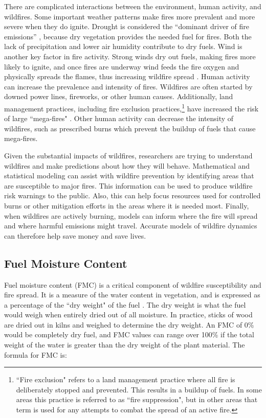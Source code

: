 \documentclass[11pt]{article}%
\begin{document}
There are complicated interactions between the environment, human activity, and wildfires. Some important weather patterns make fires more prevalent and more severe when they do ignite. Drought is considered the “dominant driver of fire emissions” \citep{IPCC-2021-LCI}, because dry vegetation provides the needed fuel for fires. Both the lack of precipitation and lower air humidity contribute to dry fuels. Wind is another key factor in fire activity. Strong winds dry out fuels, making fires more likely to ignite, and once fires are underway wind feeds the fire oxygen and physically spreads the flames, thus increasing wildfire spread \citep{Richardson-2022-GIW}. Human activity can increase the prevalence and intensity of fires. Wildfires are often started by downed power lines, fireworks, or other human causes. Additionally, land management practices, including fire exclusion practices,\footnote{``Fire exclusion" refers to a land management practice where all fire is deliberately stopped and prevented. This results in a buildup of fuels. In some areas this practice is referred to as ``fire suppression", but in other areas that term is used for any attempts to combat the spread of an active fire.} have increased the risk of large ``mega-fires" \citep{Williams-2013-EOH}. Other human activity can decrease the intensity of wildfires, such as prescribed burns which prevent the buildup of fuels that cause mega-fires.

Given the substantial impacts of wildfires, researchers are trying to understand wildfires and make predictions about how they will behave. Mathematical and statistical modeling can assist with wildfire prevention by identifying areas that are susceptible to major fires. This information can be used to produce wildfire risk warnings to the public. Also, this can help focus resources used for controlled burns or other mitigation efforts in the areas where it is needed most. Finally, when wildfires are actively burning, models can inform where the fire will spread and where harmful emissions might travel. Accurate models of wildfire dynamics can therefore help save money and save lives.

\subsection{Fuel Moisture Content}

Fuel moisture content (FMC) is a critical component of wildfire susceptibility and fire spread. It is a measure of the water content in vegetation, and is expressed as a percentage of the ``dry weight" of the fuel \citep{NCEI-2024-DFM}. The dry weight is what the fuel would weigh when entirely dried out of all moisture. In practice, sticks of wood are dried out in kilns and weighed to determine the dry weight. An FMC of 0\% would be completely dry fuel, and FMC values can range over 100\% if the total weight of the water is greater than the dry weight of the plant material. The formula for FMC is:
\end{document}
